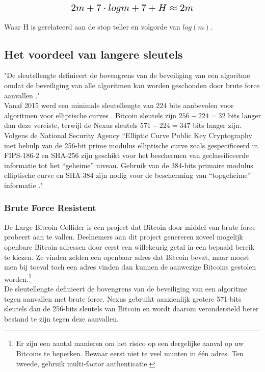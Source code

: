 \documentclass[11pt]{article}
\begin{document}
\begin{equation}
\resizebox{.5\hsize}{!}{$2 m + 7\cdot log m + 7 + H \approx 2m$}
\end{equation}

\noindent Waar H is gerelateerd aan de stop teller en volgorde van $log(m)$.

\subsection{Het voordeel van langere sleutels}

"De sleutellengte definieert de bovengrens van de beveiliging van een algoritme omdat de beveiliging van alle algoritmen kan worden geschonden door brute force aanvallen \cite{wikikeysize}." \\ 

\noindent Vanaf 2015 werd een minimale sleutellengte van 224 bits aanbevolen voor algoritmen voor elliptische curves \cite{bruteforce}.
Bitcoin sleutels zijn $256-224 = 32$ bits langer dan deze vereiste, terwijl de Nexus sleutels $571-224 = 347$ bits langer zijn.
\noindent Volgens de National Security Agency ``Elliptic Curve Public Key Cryptography met behulp van de 256-bit prime modulus elliptische curve zoals gespecificeerd in FIPS-186-2 en SHA-256 zijn geschikt voor het beschermen van geclassificeerde informatie tot het ``geheime'' niveau. 
Gebruik van de 384-bits primaire modulus elliptische curve en SHA-384 zijn nodig voor de bescherming van ``topgeheime'' informatie \cite{nsa384}."

\subsubsection*{Brute Force Resistent}

De Large Bitcoin Collider \cite{largebitcoin} is een project dat Bitcoin door middel van brute force probeert aan te vallen. Deelnemers aan dit project genereren zoveel mogelijk openbare Bitcoin adressen door eerst een willekeurig getal in een bepaald bereik te kiezen. Ze vinden zelden een openbaar adres dat Bitcoin bevat, maar moest men bij toeval toch een adres vinden dan kunnen de aanwezige Bitcoins gestolen worden.\footnote{Er zijn een aantal manieren om het risico op een dergelijke aanval op uw Bitcoins te beperken. Bewaar eerst niet te veel munten in \'e\'en adres. Ten tweede, gebruik multi-factor authenticatie.}\\

\noindent De sleutellengte definieert de bovengrens van de beveiliging van een algoritme \cite{wikikeysize} tegen aanvallen met brute force.
Nexus gebruikt aanzienlijk grotere 571-bits sleutels dan de 256-bits sleutels van Bitcoin en wordt daarom verondersteld beter bestand te zijn tegen deze aanvallen.\\ 
\end{document}
